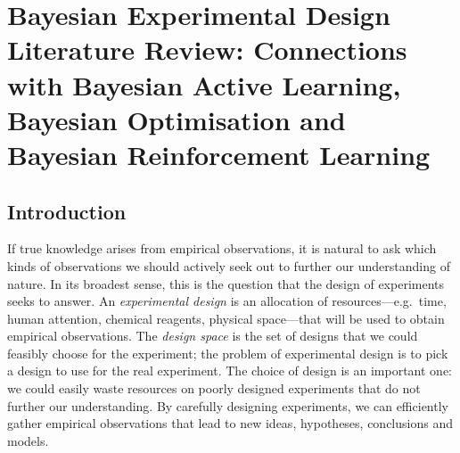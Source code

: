 \documentclass[a4paper, 10pt]{report}
\theoremstyle{plain}
\begin{document}
	
	\tableofcontents
	
	
\newpage
	
	
	
	\chapter{Bayesian Experimental Design Literature Review: Connections with Bayesian Active Learning, Bayesian Optimisation and Bayesian Reinforcement Learning}
	\label{chap:intro}
	
	\section{Introduction}
	If true knowledge arises from empirical observations, it is natural to ask which kinds of observations we should actively seek out to further our understanding of nature.
	In its broadest sense, this is the question that the design of experiments seeks to answer.
	An \emph{experimental design} is an allocation of resources---e.g.~time, human attention, chemical reagents, physical space---that will be used to obtain empirical observations.
	The \emph{design space} is the set of designs that we could feasibly choose for the experiment; the problem of experimental design is to pick a design to use for the real experiment.
	The choice of design is an important one: we could easily waste resources on poorly designed experiments that do not further our understanding.
	By carefully designing experiments, we can efficiently gather empirical observations that lead to new ideas, hypotheses, conclusions and models.
	
\end{document}
